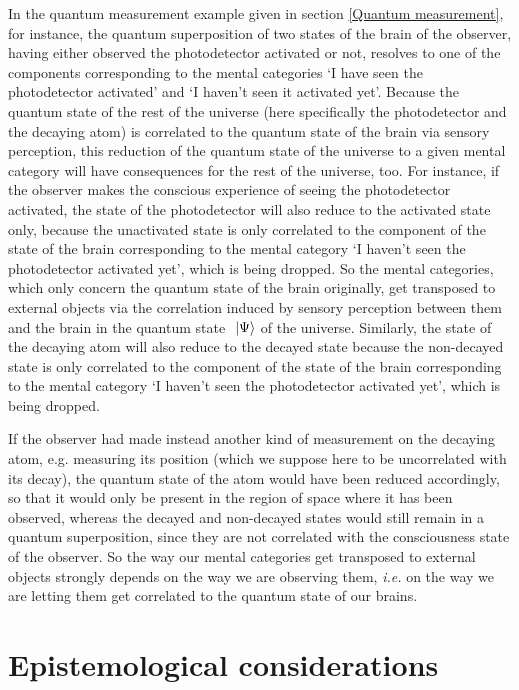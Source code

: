 In the quantum measurement example given in section \ref{Quantum measurement}, for instance, the quantum superposition of two states of the brain of the observer, having either observed the photodetector activated or not, resolves to one of the components corresponding to the mental categories `I have seen the photodetector activated' and `I haven't seen it activated yet'.
Because the quantum state of the rest of the universe (here specifically the photodetector and the decaying atom) is correlated to the quantum state of the brain via sensory perception, this reduction of the quantum state of the universe to a given mental category will have consequences for the rest of the universe, too.
For instance, if the observer makes the conscious experience of seeing the photodetector activated, the state of the photodetector will also reduce to the activated state only, because the unactivated state is only correlated to the component of the state of the brain corresponding to the mental category `I haven't seen the photodetector activated yet', which is being dropped.
So the mental categories, which only concern the quantum state of the brain originally, get transposed to external objects via the correlation induced by sensory perception between them and the brain in the quantum state $\ \left|{\Psi}\right\rangle$ of the universe.
Similarly, the state of the decaying atom will also reduce to the decayed state because the non-decayed state is only correlated to the component of the state of the brain corresponding to the mental category `I haven't seen the photodetector activated yet', which is being dropped.

If the observer had made instead another kind of measurement on the decaying atom, e.g. measuring its position (which we suppose here to be uncorrelated with its decay), the quantum state of the atom would have been reduced accordingly, so that it would only be present in the region of space where it has been observed, whereas the decayed and non-decayed states would still remain in a quantum superposition, since they are not correlated with the consciousness state of the observer.
So the way our mental categories get transposed to external objects strongly depends on the way we are observing them, \textit{i.e.} on the way we are letting them get correlated to the quantum state of our brains.

\section{Epistemological considerations}

